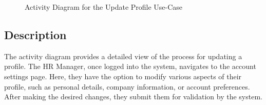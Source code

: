 \begin{figure}[H]
    \centering
    \caption{ Activity Diagram for the Update Profile Use-Case }
    \label{fig:UseCase3_Activity_Diagram}
\end{figure}

\subsection*{Description}

The activity diagram provides a detailed view of the process for updating a profile. The HR Manager, once logged into the system, navigates to the account settings page. Here, they have the option to modify various aspects of their profile, such as personal details, company information, or account preferences. After making the desired changes, they submit them for validation by the system.

